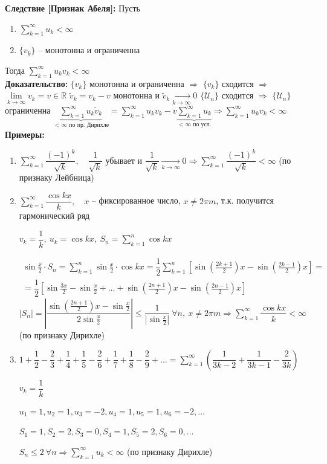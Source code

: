 \documentclass[a4paper,12pt]{article} %
\newcommand{\R}{\mathbb{R}}
\newcommand{\series}{\sum\limits_{k=1}^{\infty}}
\newcommand{\useries}{\sum\limits_{k=1}^{\infty} u_k}
\newcommand{\useriesl}{\sum\limits_{k=1}^{\infty} u_k < \infty}
\begin{document}
\textbf{Следствие [Признак Абеля]:} Пусть
\begin{enumerate}
	\item $\useriesl$
	\item $\{v_k\}$ -- монотонна и ограниченна
\end{enumerate}
Тогда $\sum\limits_{k=1}^{\infty} u_k v_k < \infty$\\
\textbf{Доказательство:}
$\{v_k\}$ монотонна и ограниченна $\Rightarrow$ $\{v_k\}$ сходится $\Rightarrow$ $\lim\limits_{k \to \infty} v_k = v \in \R$
$\tilde{v}_k = v_k - v$ монотонна и $\tilde{v}_k \xrightarrow[k \to \infty]{} 0$
$\{\mathscr{U}_n\}$ сходится $\Rightarrow$ $\{\mathscr{U}_n\}$ ограниченна
$\underbrace{\series u_k \tilde{v}_k}_{< \infty \text{ по пр. Дирихле}} = \series u_k v_k - v \underbrace{\useries}_{< \infty \text{ по усл.}} \Rightarrow \series u_k v_k < \infty$\\
\textbf{Примеры:}
\begin{enumerate}
	\item $\series \dfrac{(-1)^k}{\sqrt{k}}, \hspace{1em} \dfrac{1}{\sqrt{k}} \text{ убывает и } \dfrac{1}{\sqrt{k}} \xrightarrow[k \to \infty]{} 0 \Rightarrow \series \dfrac{(-1)^k}{\sqrt{k}} < \infty$ (по признаку Лейбница) 
	\item $\series \dfrac{\cos kx}{k}, \hspace{1em} x$ -- фиксированное число, $x \neq 2 \pi m$, т.к. получится гармонический ряд
	
	$v_k = \dfrac{1}{k}, \ u_k = \cos kx, \ S_n = \sum\limits_{k=1}^{n} \cos kx$
	
	\begin{multline*}
		\sin{\frac{x}{2}} \cdot S_n = \sum\limits_{k=1}^{n} \sin{\frac{x}{2}} \cdot \cos kx = \dfrac{1}{2} \sum\limits_{k=1}^{n} \left[ \sin{\left(\frac{2k+1}{2}\right)x} - \sin{\left(\frac{2k-1}{2}\right)x} \right] = \\ = \dfrac{1}{2} \left[ \sin{\frac{3x}{2}} - \sin{\frac{x}{2}} + \ldots + \sin{\left(\frac{2n+1}{2}\right)x} - \sin{\left(\frac{2n-1}{2}\right)x} \right]
	\end{multline*}
	$\left| S_n \right| = \left| \dfrac{\sin{\left(\frac{2n+1}{2}\right)x} - \sin \frac{x}{2}}{2 \sin\frac{x}{2}} \right| \leqslant \dfrac{1}{\left| \sin \frac{x}{2} \right|} \ \forall n, \ x \neq 2 \pi m \Rightarrow \series \dfrac{\cos kx}{k} < \infty$ (по признаку Дирихле)
	\item $1 + \dfrac{1}{2} - \dfrac{2}{3} + \dfrac{1}{4} + \dfrac{1}{5} - \dfrac{2}{6} + \dfrac{1}{7} + \dfrac{1}{8} - \dfrac{2}{9} + \ldots = \series \left( \dfrac{1}{3k-2} + \dfrac{1}{3k-1} - \dfrac{2}{3k}  \right)$
	
	$v_k = \dfrac{1}{k}$
	
	$u_1 = 1, u_2 = 1, u_3 = -2, u_4 = 1, u_5 = 1, u_6 = -2, \ldots$
	
	$S_1 = 1, S_2 = 2, S_3 = 0, S_4 = 1, S_5 = 2, S_6 = 0, \ldots$
	
	$S_n \leqslant 2 \ \forall n \Rightarrow \useriesl$ (по признаку Дирихле)
\end{enumerate}
\end{document}
